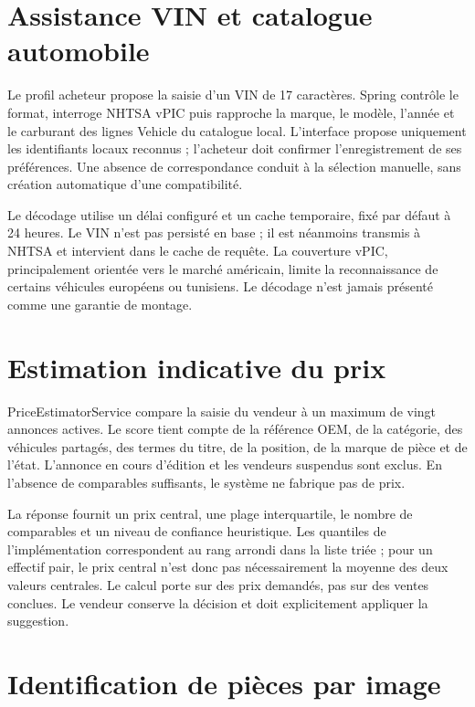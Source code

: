 \section{Assistance VIN et catalogue automobile}

Le profil acheteur propose la saisie d'un VIN de 17 caractères. Spring contrôle le format, interroge NHTSA vPIC puis rapproche la marque, le modèle, l'année et le carburant des lignes Vehicle du catalogue local. L'interface propose uniquement les identifiants locaux reconnus ; l'acheteur doit confirmer l'enregistrement de ses préférences. Une absence de correspondance conduit à la sélection manuelle, sans création automatique d'une compatibilité.


Le décodage utilise un délai configuré et un cache temporaire, fixé par défaut à 24 heures. Le VIN n'est pas persisté en base ; il est néanmoins transmis à NHTSA et intervient dans le cache de requête. La couverture vPIC, principalement orientée vers le marché américain, limite la reconnaissance de certains véhicules européens ou tunisiens. Le décodage n'est jamais présenté comme une garantie de montage.


\section{Estimation indicative du prix}

PriceEstimatorService compare la saisie du vendeur à un maximum de vingt annonces actives. Le score tient compte de la référence OEM, de la catégorie, des véhicules partagés, des termes du titre, de la position, de la marque de pièce et de l'état. L'annonce en cours d'édition et les vendeurs suspendus sont exclus. En l'absence de comparables suffisants, le système ne fabrique pas de prix.


La réponse fournit un prix central, une plage interquartile, le nombre de comparables et un niveau de confiance heuristique. Les quantiles de l'implémentation correspondent au rang arrondi dans la liste triée ; pour un effectif pair, le prix central n'est donc pas nécessairement la moyenne des deux valeurs centrales. Le calcul porte sur des prix demandés, pas sur des ventes conclues. Le vendeur conserve la décision et doit explicitement appliquer la suggestion.


\section{Identification de pièces par image}

